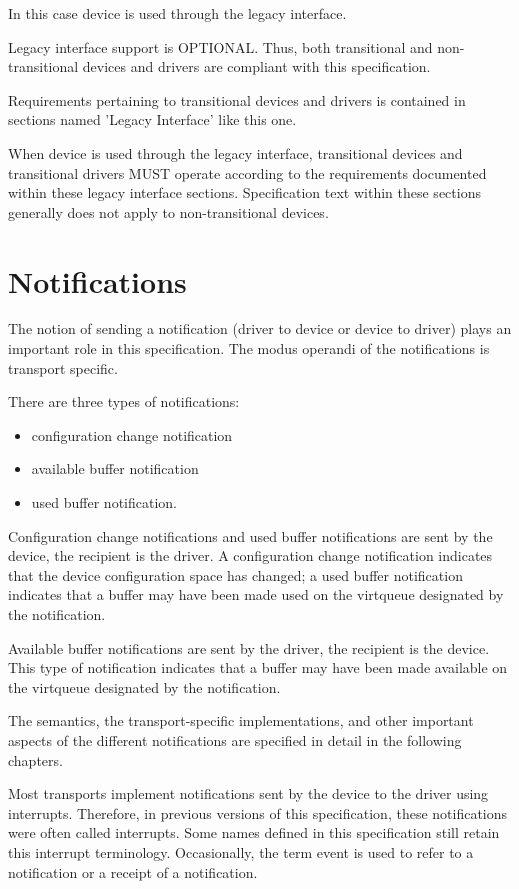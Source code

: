 In this case device is used through the legacy interface.

Legacy interface support is OPTIONAL.
Thus, both transitional and non-transitional devices and
drivers are compliant with this specification.

Requirements pertaining to transitional devices and drivers
is contained in sections named 'Legacy Interface' like this one.

When device is used through the legacy interface, transitional
devices and transitional drivers MUST operate according to the
requirements documented within these legacy interface sections.
Specification text within these sections generally does not apply
to non-transitional devices.

\section{Notifications}\label{sec:Basic Facilities of a Virtio Device
/ Notifications}

The notion of sending a notification (driver to device or device
to driver) plays an important role in this specification. The
modus operandi of the notifications is transport specific.

There are three types of notifications: 
\begin{itemize}
\item configuration change notification
\item available buffer notification
\item used buffer notification. 
\end{itemize}

Configuration change notifications and used buffer notifications are sent
by the device, the recipient is the driver. A configuration change
notification indicates that the device configuration space has changed; a
used buffer notification indicates that a buffer may have been made used
on the virtqueue designated by the notification.

Available buffer notifications are sent by the driver, the recipient is
the device. This type of notification indicates that a buffer may have
been made available on the virtqueue designated by the notification.

The semantics, the transport-specific implementations, and other
important aspects of the different notifications are specified in detail
in the following chapters.

Most transports implement notifications sent by the device to the
driver using interrupts. Therefore, in previous versions of this
specification, these notifications were often called interrupts.
Some names defined in this specification still retain this interrupt
terminology. Occasionally, the term event is used to refer to
a notification or a receipt of a notification.

